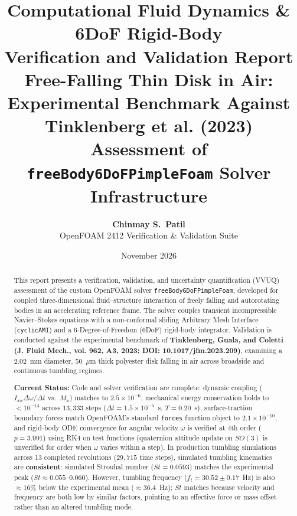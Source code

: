 \documentclass[11pt,a4paper]{article}
\title{\vspace{-10mm}\bfseries\color{foamNavy}\LARGE Computational Fluid Dynamics \& 6DoF Rigid-Body\\Verification and Validation Report\\[3mm]
\large Free-Falling Thin Disk in Air: Experimental Benchmark Against Tinklenberg et al. (2023)\\[1mm]
\normalsize Assessment of \texttt{freeBody6DoFPimpleFoam} Solver Infrastructure}
\author{\textbf{Chinmay S.\ Patil} \\
OpenFOAM 2412 Verification \& Validation Suite}
\date{November 2026}
\begin{document}
\maketitle

\begin{abstract}
\noindent This report presents a verification, validation, and uncertainty quantification (VVUQ) assessment of the custom OpenFOAM solver \texttt{freeBody6DoFPimpleFoam}, developed for coupled three-dimensional fluid--structure interaction of freely falling and autorotating bodies in an accelerating reference frame. The solver couples transient incompressible Navier--Stokes equations with a non-conformal sliding Arbitrary Mesh Interface (\texttt{cyclicAMI}) and a 6-Degree-of-Freedom (6DoF) rigid-body integrator. Validation is conducted against the experimental benchmark of \textbf{Tinklenberg, Guala, and Coletti (J. Fluid Mech., vol. 962, A3, 2023; DOI: 10.1017/jfm.2023.209)}, examining a 2.02~mm diameter, 50~$\mu$m thick polyester disk falling in air across broadside and continuous tumbling regimes.

\medskip
\noindent \textbf{Current Status:} Code and solver verification are complete: dynamic coupling ($I_{xx} \Delta\omega / \Delta t$ vs.\ $M_x$) matches to $2.5 \times 10^{-6}$, mechanical energy conservation holds to $< 10^{-14}$ across $13,333$ steps ($\Delta t = 1.5 \times 10^{-5}$~s, $T = 0.20$~s), surface-traction boundary forces match OpenFOAM's standard \texttt{forces} function object to $2.1 \times 10^{-10}$, and rigid-body ODE convergence for angular velocity $\omega$ is verified at 4th order ($p = 3.991$) using RK4 on test functions (quaternion attitude update on $SO(3)$ is unverified for order when $\omega$ varies within a step). In production tumbling simulations across 13 completed revolutions ($29,715$ time steps), simulated tumbling kinematics are \textbf{consistent}: simulated Strouhal number ($St = 0.0593$) matches the experimental peak ($St \approx 0.055$--$0.060$). However, tumbling frequency ($f_t = 30.52 \pm 0.17$~Hz) is also $\approx 16\%$ below the experimental mean ($\approx 36.4$~Hz); $St$ matches because velocity and frequency are both low by similar factors, pointing to an effective force or mass offset rather than an altered tumbling mode.


\end{abstract}
\end{document}
